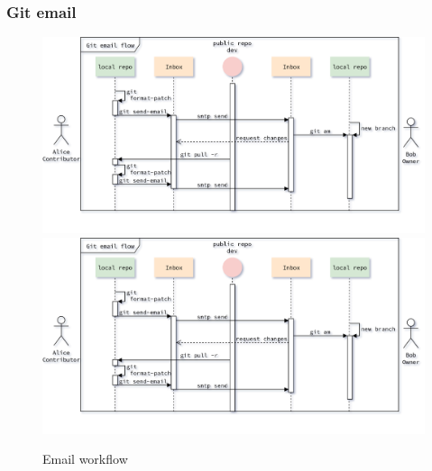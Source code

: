 \begin{frame}
    \frametitle{Git email}
    \begin{figure}
        \begin{center}
            {
                \includegraphics[height=0.7\textheight,keepaspectratio]{./images/EmailWorkflow_SendSecoundPatch.png}
            }
            {
                \includegraphics[height=0.75\textheight,keepaspectratio]{./images/EmailWorkflow_SendSecoundPatch.png}
            }
            \caption{Email workflow}
        \end{center}
    \end{figure}
\end{frame}

